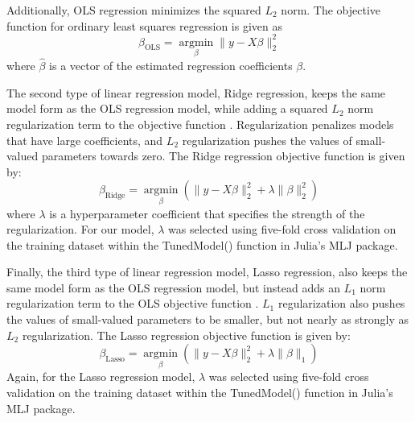 \documentclass[NewProceedings,letterpaper,NoPageNumbers,NoLineNumbers, DoubleSpace]{ascelike-new}
\begin{document}
Additionally, OLS regression minimizes the squared $L_2$ norm. The objective function for ordinary least squares regression is given as 
\[
\beta_{\text{OLS}} = \underset{\beta}{\operatorname{argmin}} \lVert y - X\beta \rVert_2^2
\]
where $\hat{\beta}$ is a vector of the estimated regression coefficients $\beta$.

The second type of linear regression model, Ridge regression, keeps the same model form as the OLS regression model, while adding a squared $L_2$ norm regularization term to the objective function \cite{brunton2022data}. Regularization penalizes models that have large coefficients, and $L_2$ regularization pushes the values of small-valued parameters towards zero. The Ridge regression objective function is given by:
\[
\beta_{\text{Ridge}} = \underset{\beta}{\operatorname{argmin}} \left( \lVert y - X\beta \rVert_2^2 + \lambda \lVert \beta \rVert_2^2 \right)
\]
where $\lambda$ is a hyperparameter coefficient that specifies the strength of the regularization. For our model, $\lambda$ was selected using five-fold cross validation on the training dataset within the TunedModel() function in Julia's MLJ package.

Finally, the third type of linear regression model, Lasso regression, also keeps the same model form as the OLS regression model, but instead adds an $L_1$ norm regularization term to the OLS objective function \cite{brunton2022data}. $L_1$ regularization also pushes the values of small-valued parameters to be smaller, but not nearly as strongly as $L_2$ regularization. The Lasso regression objective function is given by:
\[
\beta_{\text{Lasso}} = \underset{\beta}{\operatorname{argmin}} \left( \lVert y - X\beta \rVert_2^2 + \lambda \lVert \beta \rVert_1 \right)
\]
Again, for the Lasso regression model, $\lambda$ was selected using five-fold cross validation on the training dataset within the TunedModel() function in Julia's MLJ package.
\end{document}
